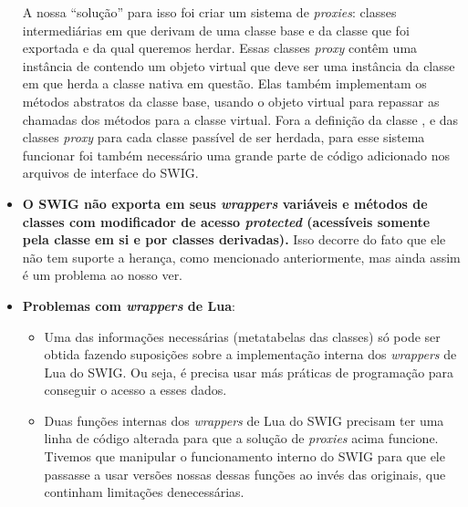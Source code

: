 \begin{itemize}
      A nossa ``solução'' para isso foi criar um sistema de \textit{proxies}\footnotemark{}: classes
      intermediárias em \CXX{} que derivam de uma classe base  e da classe
      \CXX{} que foi exportada e da qual queremos herdar. Essas classes \textit{proxy} contêm uma
      instância de \VObj{} contendo um objeto virtual que deve ser uma instância da classe em
      \script{} que herda a classe nativa em questão. Elas também implementam os métodos abstratos
      da classe base, usando o objeto virtual para repassar as chamadas dos métodos para a classe
      virtual. Fora a definição da classe , e das classes \textit{proxy} para cada
      classe \CXX{} passível de ser herdada, para esse sistema funcionar foi também necessário uma
      grande parte de código adicionado nos arquivos de interface do SWIG.
      
      
    \item \textbf{O SWIG não exporta em seus \textit{wrappers} variáveis e métodos de classes com 
      modificador de acesso \textit{protected} (acessíveis somente pela classe em si e por 
      classes derivadas).} Isso decorre do fato que ele não tem suporte a herança, como mencionado
      anteriormente, mas ainda assim é um problema ao nosso ver.
    \item \textbf{Problemas com \textit{wrappers} de Lua}:
      \begin{itemize}
        \item Uma das informações necessárias (metatabelas das classes) só pode ser obtida
          fazendo suposições sobre a implementação interna dos \textit{wrappers} de Lua do SWIG.
          Ou seja, é precisa usar más práticas de programação para conseguir o acesso a esses
          dados.
        \item Duas funções internas dos \textit{wrappers} de Lua do SWIG precisam ter uma linha
          de código alterada para que a solução de \textit{proxies} acima funcione. Tivemos que
          manipular o funcionamento interno do SWIG para que ele passasse a usar versões nossas
          dessas funções ao invés das originais, que continham limitações denecessárias.
      \end{itemize}
  \end{itemize}
  
